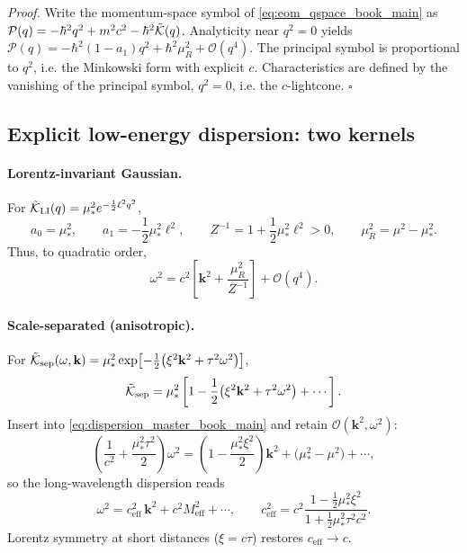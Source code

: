 \emph{Proof.}
Write the momentum-space symbol of \eqref{eq:eom_qspace_book_main} as
\(\mathcal{P}(q)=-\hbar^2 q^2+m^2c^2-\hbar^2\tilde{\mathcal{K}}(q)\).
Analyticity near \(q^2=0\) yields \(\mathcal{P}(q)=-\hbar^2(1-a_1)q^2+\hbar^2\mu_R^2+\mathcal{O}(q^4)\).
The principal symbol is proportional to \(q^2\), i.e. the Minkowski form with explicit \(c\). Characteristics are defined by the vanishing of the principal symbol, \(q^2=0\), i.e. the \(c\)-lightcone. \(\square\)

\subsection{Explicit low-energy dispersion: two kernels}
\paragraph{Lorentz-invariant Gaussian.}
For \(\tilde{\mathcal{K}}_{\mathrm{LI}}(q)=\mu_*^2 e^{-\frac{1}{2}\ell^2 q^2}\),
\begin{equation}
a_0=\mu_*^2,\qquad a_1=-\frac{1}{2}\mu_*^2\ell^2,\qquad
Z^{-1}=1+\frac{1}{2}\mu_*^2\ell^2>0,\qquad \mu_R^2=\mu^2-\mu_*^2.
\end{equation}
Thus, to quadratic order,
\begin{equation}
\omega^2=c^2\left[\mathbf{k}^2+\frac{\mu_R^2}{Z^{-1}}\right]+\mathcal{O}(q^4).
\end{equation}

\paragraph{Scale-separated (anisotropic).}
For \(\tilde{\mathcal{K}}_{\mathrm{sep}}(\omega,\mathbf{k})=\mu_*^2\exp\!\left[-\frac{1}{2}\big(\xi^2\mathbf{k}^2+\tau^2\omega^2\big)\right]\),
\begin{equation}
\tilde{\mathcal{K}}_{\mathrm{sep}}=\mu_*^2\left[1-\frac{1}{2}\big(\xi^2\mathbf{k}^2+\tau^2\omega^2\big)+\cdots\right].
\end{equation}
Insert into \eqref{eq:dispersion_master_book_main} and retain \(\mathcal{O}(\mathbf{k}^2,\omega^2)\):
\begin{equation}\label{eq:anisotropic_speed_book_main}
\left(\frac{1}{c^{2}}+\frac{\mu_*^2\tau^2}{2}\right)\omega^2
=\left(1-\frac{\mu_*^2\xi^2}{2}\right)\mathbf{k}^2+\big(\mu_*^2-\mu^2\big)+\cdots,
\end{equation}
so the long-wavelength dispersion reads
\begin{equation}
\omega^2=c_{\mathrm{eff}}^{2}\,\mathbf{k}^2+c^2 M_{\mathrm{eff}}^2+\cdots,\qquad
c_{\mathrm{eff}}^{2}=c^{2}\frac{1-\frac{1}{2}\mu_*^2\xi^2}{1+\frac{1}{2}\mu_*^2\tau^2 c^2}.
\end{equation}
Lorentz symmetry at short distances (\(\xi=c\tau\)) restores \(c_{\mathrm{eff}}\to c\).

